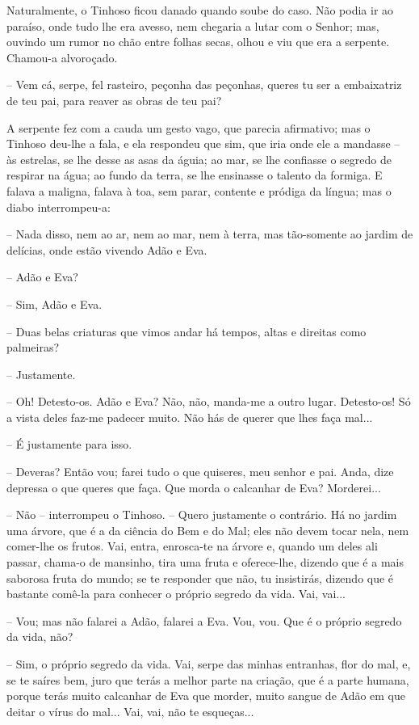 Naturalmente, o Tinhoso ficou danado quando soube do caso. Não podia ir
ao paraíso, onde tudo lhe era avesso, nem chegaria a lutar com o Senhor;
mas, ouvindo um rumor no chão entre folhas secas, olhou e viu que era a
serpente. Chamou-a alvoroçado.

-- Vem cá, serpe, fel rasteiro, peçonha das peçonhas, queres tu ser a
embaixatriz de teu pai, para reaver as obras de teu pai?

A serpente fez com a cauda um gesto vago, que parecia afirmativo; mas o
Tinhoso deu-lhe a fala, e ela respondeu que sim, que iria onde ele a
mandasse -- às estrelas, se lhe desse as asas da águia; ao mar, se lhe
confiasse o segredo de respirar na água; ao fundo da terra, se lhe
ensinasse o talento da formiga. E falava a maligna, falava à toa, sem
parar, contente e pródiga da língua; mas o diabo interrompeu-a:

-- Nada disso, nem ao ar, nem ao mar, nem à terra, mas tão-somente ao
jardim de delícias, onde estão vivendo Adão e Eva.

-- Adão e Eva?

-- Sim, Adão e Eva.

-- Duas belas criaturas que vimos andar há tempos, altas e direitas como
palmeiras?

-- Justamente.

-- Oh! Detesto-os. Adão e Eva? Não, não, manda-me a outro lugar.
Detesto-os! Só a vista deles faz-me padecer muito. Não hás de querer que
lhes faça mal...

-- É justamente para isso.

-- Deveras? Então vou; farei tudo o que quiseres, meu senhor e pai.
Anda, dize depressa o que queres que faça. Que morda o calcanhar de Eva?
Morderei...

-- Não -- interrompeu o Tinhoso. -- Quero justamente o contrário. Há no
jardim uma árvore, que é a da ciência do Bem e do Mal; eles não devem
tocar nela, nem comer-lhe os frutos. Vai, entra, enrosca-te na árvore e,
quando um deles ali passar, chama-o de mansinho, tira uma fruta e
oferece-lhe, dizendo que é a mais saborosa fruta do mundo; se te
responder que não, tu insistirás, dizendo que é bastante comê-la para
conhecer o próprio segredo da vida. Vai, vai...

-- Vou; mas não falarei a Adão, falarei a Eva. Vou, vou. Que é o próprio
segredo da vida, não?

-- Sim, o próprio segredo da vida. Vai, serpe das minhas entranhas, flor
do mal, e, se te saíres bem, juro que terás a melhor parte na criação,
que é a parte humana, porque terás muito calcanhar de Eva que morder,
muito sangue de Adão em que deitar o vírus do mal... Vai, vai, não te
esqueças...

